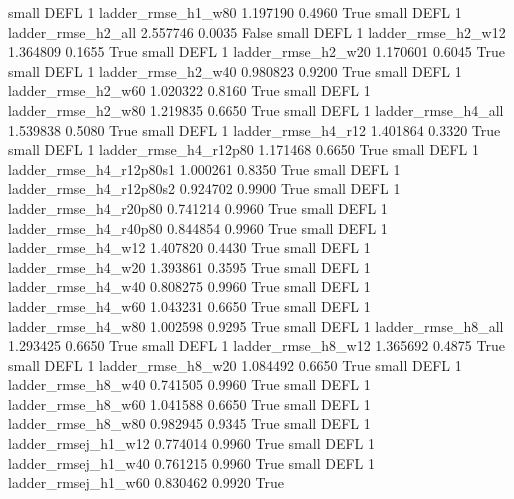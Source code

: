      small     DEFL                 1       ladder_rmse_h1_w80   1.197190      0.4960    True
     small     DEFL                 1       ladder_rmse_h2_all   2.557746      0.0035   False
     small     DEFL                 1       ladder_rmse_h2_w12   1.364809      0.1655    True
     small     DEFL                 1       ladder_rmse_h2_w20   1.170601      0.6045    True
     small     DEFL                 1       ladder_rmse_h2_w40   0.980823      0.9200    True
     small     DEFL                 1       ladder_rmse_h2_w60   1.020322      0.8160    True
     small     DEFL                 1       ladder_rmse_h2_w80   1.219835      0.6650    True
     small     DEFL                 1       ladder_rmse_h4_all   1.539838      0.5080    True
     small     DEFL                 1       ladder_rmse_h4_r12   1.401864      0.3320    True
     small     DEFL                 1    ladder_rmse_h4_r12p80   1.171468      0.6650    True
     small     DEFL                 1  ladder_rmse_h4_r12p80s1   1.000261      0.8350    True
     small     DEFL                 1  ladder_rmse_h4_r12p80s2   0.924702      0.9900    True
     small     DEFL                 1    ladder_rmse_h4_r20p80   0.741214      0.9960    True
     small     DEFL                 1    ladder_rmse_h4_r40p80   0.844854      0.9960    True
     small     DEFL                 1       ladder_rmse_h4_w12   1.407820      0.4430    True
     small     DEFL                 1       ladder_rmse_h4_w20   1.393861      0.3595    True
     small     DEFL                 1       ladder_rmse_h4_w40   0.808275      0.9960    True
     small     DEFL                 1       ladder_rmse_h4_w60   1.043231      0.6650    True
     small     DEFL                 1       ladder_rmse_h4_w80   1.002598      0.9295    True
     small     DEFL                 1       ladder_rmse_h8_all   1.293425      0.6650    True
     small     DEFL                 1       ladder_rmse_h8_w12   1.365692      0.4875    True
     small     DEFL                 1       ladder_rmse_h8_w20   1.084492      0.6650    True
     small     DEFL                 1       ladder_rmse_h8_w40   0.741505      0.9960    True
     small     DEFL                 1       ladder_rmse_h8_w60   1.041588      0.6650    True
     small     DEFL                 1       ladder_rmse_h8_w80   0.982945      0.9345    True
     small     DEFL                 1      ladder_rmsej_h1_w12   0.774014      0.9960    True
     small     DEFL                 1      ladder_rmsej_h1_w40   0.761215      0.9960    True
     small     DEFL                 1      ladder_rmsej_h1_w60   0.830462      0.9920    True
